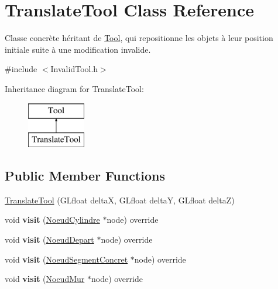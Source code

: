 \hypertarget{class_translate_tool}{}\section{Translate\+Tool Class Reference}
\label{class_translate_tool}


Classe concrète héritant de \hyperlink{class_tool}{Tool}, qui repositionne les objets à leur position initiale suite à une modification invalide.  




{\ttfamily \#include $<$Invalid\+Tool.\+h$>$}

Inheritance diagram for Translate\+Tool\+:\begin{figure}[H]
\begin{center}
\leavevmode
\includegraphics[height=2.000000cm]{class_translate_tool}
\end{center}
\end{figure}
\subsection*{Public Member Functions}
\begin{DoxyCompactItemize}
\item 
\hyperlink{group__inf2990_ga48e1c155fef64a5a07991df870721ae6}{Translate\+Tool} (G\+Lfloat delta\+X, G\+Lfloat delta\+Y, G\+Lfloat delta\+Z)
\item 
\hypertarget{group__inf2990_ga64811cbd57db1cb725dc0d472c8f5ab1}{}void {\bfseries visit} (\hyperlink{class_noeud_cylindre}{Noeud\+Cylindre} $\ast$node) override\label{group__inf2990_ga64811cbd57db1cb725dc0d472c8f5ab1}

\item 
\hypertarget{group__inf2990_gab0781475ac48f2dcb8610bfee475aba3}{}void {\bfseries visit} (\hyperlink{class_noeud_depart}{Noeud\+Depart} $\ast$node) override\label{group__inf2990_gab0781475ac48f2dcb8610bfee475aba3}

\item 
\hypertarget{group__inf2990_ga3533e88b9fcc0f815cccb9e33773d756}{}void {\bfseries visit} (\hyperlink{class_noeud_segment_concret}{Noeud\+Segment\+Concret} $\ast$node) override\label{group__inf2990_ga3533e88b9fcc0f815cccb9e33773d756}

\item 
\hypertarget{group__inf2990_ga7172d03575c6b5062c61753f8d0bce08}{}void {\bfseries visit} (\hyperlink{class_noeud_mur}{Noeud\+Mur} $\ast$node) override\label{group__inf2990_ga7172d03575c6b5062c61753f8d0bce08}

\end{DoxyCompactItemize}
